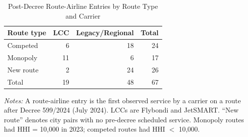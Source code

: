 \begin{table}[t]
\centering
\caption{Post-Decree Route-Airline Entries by Route Type and Carrier}
\label{tab:entry}
\begin{tabular}{lrrr}
\toprule
Route type & LCC & Legacy/Regional & Total \\
\midrule
Competed & 6 & 18 & 24 \\
Monopoly & 11 & 6 & 17 \\
New route & 2 & 24 & 26 \\
\midrule
Total & 19 & 48 & 67 \\
\bottomrule
\end{tabular}
\begin{tablenotes}
\item \textit{Notes:} A route-airline entry is the first observed service by a carrier on a route after Decree 599/2024 (July 2024). LCCs are Flybondi and JetSMART. ``New route'' denotes city pairs with no pre-decree scheduled service. Monopoly routes had HHI = 10,000 in 2023; competed routes had HHI $<$ 10,000.
\end{tablenotes}
\end{table}
